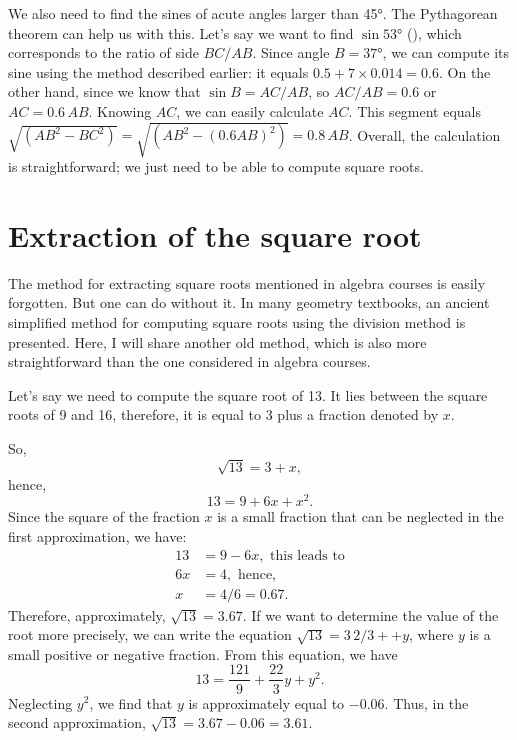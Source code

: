 We also need to find the sines of acute angles larger than \ang{45}. The Pythagorean theorem can help us with this. Let's say we want to find $\sin \ang{53}$ (), which corresponds to the ratio of side $BC/AB$. Since angle $B = \ang{37}$, we can compute its sine using the method described earlier: it equals $0.5 + 7 \times 0.014 = 0.6$. On the other hand, since we know that $\sin B = AC/ AB$, so $AC/AB = 0.6$ or $AC = 0.6 \, AB$. Knowing $AC$, we can easily calculate $AC$. This segment equals $\sqrt{(AB^{2} - BC^{2})} = \sqrt{(AB^{2} - (0.6AB)^{2})} = 0.8\, AB$. Overall, the calculation is straightforward; we just need to be able to compute square roots.


\section{Extraction of the square root}
\label{sec-5.2}

The method for extracting square roots mentioned in algebra courses is easily forgotten. But one can do without it. In many geometry textbooks, an ancient simplified method for computing square roots using the division method is presented. Here, I will share another old method, which is also more straightforward than the one considered in algebra courses.

Let's say we need to compute the square root of 13. It lies between the square roots of 9 and 16, therefore, it is equal to 3 plus a fraction denoted by $x$.

So,
\begin{equation*}%
\sqrt{13} = 3 + x,
\end{equation*}
hence,
\begin{equation*}%
13 = 9 + 6x + x^{2}.
\end{equation*}
Since the square of the fraction $x$ is a small fraction that can be neglected in the first approximation, we have:
\begin{align*}%
13 &= 9 - 6x, \,\, \text{this leads to} \\
6x & = 4,\,\, \text{hence,}\\
x & = 4/6 = 0.67.
\end{align*}
Therefore, approximately, $\sqrt{13} = 3.67$. If we want to determine the value of the root more precisely, we can write the equation $\sqrt{13} = 3 \, 2/3+ + y$, where $y$ is a small positive or negative fraction. From this equation, we have
\begin{equation*}%
13 = \frac{121}{9}  + \frac{22}{3} y  + y^{2}.
\end{equation*}
Neglecting $y^{2}$, we find that $y$ is approximately equal to $-0.06$. Thus, in the second approximation, $\sqrt{13} = 3.67 - 0.06 = 3.61.$

